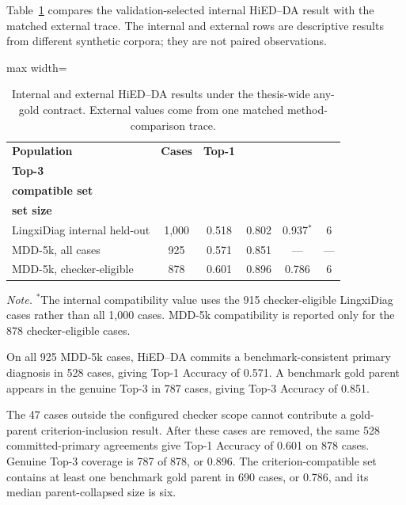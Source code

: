 Table~\ref{tab:external-summary-rewrite} compares the validation-selected internal HiED--DA result with the matched external trace. The internal and external rows are descriptive results from different synthetic corpora; they are not paired observations.

\begin{table}[htbp]
\centering
\caption{Internal and external HiED--DA results under the thesis-wide any-gold contract. External values come from one matched method-comparison trace.}
\label{tab:external-summary-rewrite}
\small
\begin{adjustbox}{max width=\textwidth}
\begin{tabular}{|l|c|c|c|c|c|}
\hline
\textbf{Population} & \textbf{Cases} & \textbf{Top-1} & \shortstack{\textbf{Genuine}\\\textbf{Top-3}} & \shortstack{\textbf{Gold in}\\\textbf{compatible set}} & \shortstack{\textbf{Median compatible-}\\\textbf{set size}}\\
\hline
LingxiDiag internal held-out & 1,000 & 0.518 & 0.802 & 0.937$^{*}$ & 6\\
\hline
MDD-5k, all cases & 925 & 0.571 & 0.851 & --- & ---\\
\hline
MDD-5k, checker-eligible & 878 & 0.601 & 0.896 & 0.786 & 6\\
\hline
\end{tabular}
\end{adjustbox}
\parbox{0.96\textwidth}{\footnotesize
\textit{Note.} $^{*}$The internal compatibility value uses the 915 checker-eligible LingxiDiag cases rather than all 1,000 cases. MDD-5k compatibility is reported only for the 878 checker-eligible cases.}
\end{table}

On all 925 MDD-5k cases, HiED--DA commits a benchmark-consistent primary diagnosis in 528 cases, giving Top-1 Accuracy of 0.571. A benchmark gold parent appears in the genuine Top-3 in 787 cases, giving Top-3 Accuracy of 0.851.

The 47 cases outside the configured checker scope cannot contribute a gold-parent criterion-inclusion result. After these cases are removed, the same 528 committed-primary agreements give Top-1 Accuracy of 0.601 on 878 cases. Genuine Top-3 coverage is 787 of 878, or 0.896. The criterion-compatible set contains at least one benchmark gold parent in 690 cases, or 0.786, and its median parent-collapsed size is six.

